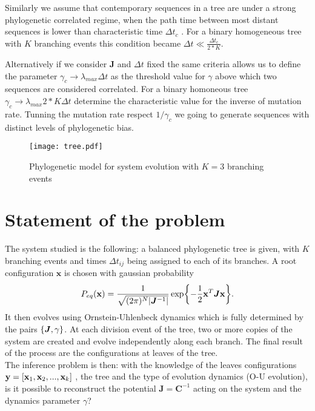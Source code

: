 \documentclass[reprint,amsmath,amssymb,superscriptaddress,showpacs,pre]{revtex4-1}
\let\originalleft\left
\let\originalright\right
\renewcommand{\left}{\mathopen{}\mathclose\bgroup\originalleft}
\renewcommand{\right}{\aftergroup\egroup\originalright}
\begin{document}
Similarly we assume  that contemporary sequences in a tree are   under a strong phylogenetic correlated regime, when the  path time between most distant sequences is lower than characteristic time $\Delta t_c$ . For a binary homogeneous tree with  $K$ branching events this condition became $\Delta t \ll \frac{\Delta t_c}{2*K}$.

 Alternatively if we consider $\bm J$ and $\Delta t$  fixed the same criteria allows us to define the  parameter $\gamma_c\rightarrow \lambda_{max}\Delta t $  as the threshold value for $\gamma$  above which two sequences are considered correlated. For a binary homoneous tree $\gamma_c\rightarrow \lambda_{max}2*K\Delta t $ determine the  characteristic value for the inverse of mutation rate. Tunning the mutation rate respect $1/\gamma_c$ we going to generate sequences with distinct levels of phylogenetic bias. 


\begin{figure}[!htb]
\texttt{[image: tree.pdf]}
\caption{ Phylogenetic model for system evolution  with $K=3$ branching events \label{fig:tree}}
\end{figure}

\section{Statement of the problem}
\label{statement of the problem}
The system studied is the following: a balanced phylogenetic tree is given, with $K$ branching events and times $\Delta t_{ij}$ being assigned to each of its branches. A root configuration $\mathbf{x}$ is chosen with gaussian probability 
$$ P_{eq}(\mathbf{x}) = \frac{1}{\sqrt{(2\pi)^N \vert \bm{J}^{-1}\vert}}\exp\left\{ -\frac{1}{2}\mathbf{x}^T\bm{J}\mathbf{x} \right\}. $$ 
It then evolves using Ornstein-Uhlenbeck dynamics which is fully determined by the pairs $\left\lbrace \bm J,\gamma \right\rbrace $. At each division event of the tree, two or more  copies of the system are created and evolve independently along each branch. The final result of the process are the configurations at leaves of the tree. \\
The inference problem is then: with the knowledge of the leaves configurations $\mathbf{y}=\left[ \mathbf{x}_1,\mathbf{x}_2,...,\mathbf{x}_k\right] $ , the tree and  the type of evolution dynamics (O-U evolution), is it possible to reconstruct the potential $\bm J=\bm{C}^{-1}$ acting on the system and the dynamics parameter $\gamma$? 
\end{document}
